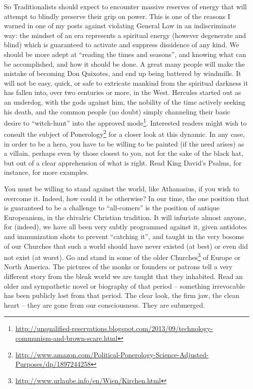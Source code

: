 So Traditionalists should expect to encounter massive reserves of energy that will attempt to blindly preserve their grip on power. This is one of the reasons I warned in one of my posts against violating General Law in an indiscriminate way: the mindset of an era represents a spiritual energy (however degenerate and blind) which is guaranteed to activate and suppress dissidence of any kind. We should be more adept at ``reading the times and seasons'', and knowing what can be accomplished, and how it should be done. A great many people will make the mistake of becoming Don Quixotes, and end up being battered by windmills. It will not be easy, quick, or safe to extricate mankind from the spiritual darkness it has fallen into, over two centuries or more, in the West. Hercules started out as an underdog, with the gods against him, the nobility of the time actively seeking his death, and the common people (no doubt) simply channeling their basic desire to ``witch-hunt'' into the approved mode\footnote{\url{http://unqualified-reservations.blogspot.com/2013/09/technology-communism-and-brown-scare.html}}. Interested readers might wish to consult the subject of Ponerology\footnote{\url{http://www.amazon.com/Political-Ponerology-Science-Adjusted-Purposes/dp/1897244258}} for a closer look at this dynamic. In any case, in order to be a hero, you have to be willing to be painted (if the need arises) as a villain, perhaps even by those closest to you, not for the sake of the black hat, but out of a clear apprehension of what is right. Read King David's Psalms, for instance, for more examples.

You must be willing to stand against the world, like Athanasius, if you wish to overcome it. Indeed, how could it be otherwise? In our time, the one position that is guaranteed to be a challenge to ``all-comers'' is the position of antique Europeanism, in the chivalric Christian tradition. It will infuriate almost anyone, for (indeed), we have all been very subtly programmed against it, given antidotes and immunization shots to prevent ``catching it'', and taught in the very bosoms of our Churches that such a world should have never existed (at best) or even did not exist (at worst). Go and stand in some of the older Churches\footnote{\url{http://www.urlaube.info/en/Wien/Kirchen.html}} of Europe or North America. The pictures of the monks or founders or patrons tell a very different story from the bleak world we are taught that they inhabited. Read an older and sympathetic novel or biography of that period -- something irrevocable has been publicly lost from that period. The clear look, the firm jaw, the clean heart -- they are gone from our consciousness. They are submerged.

